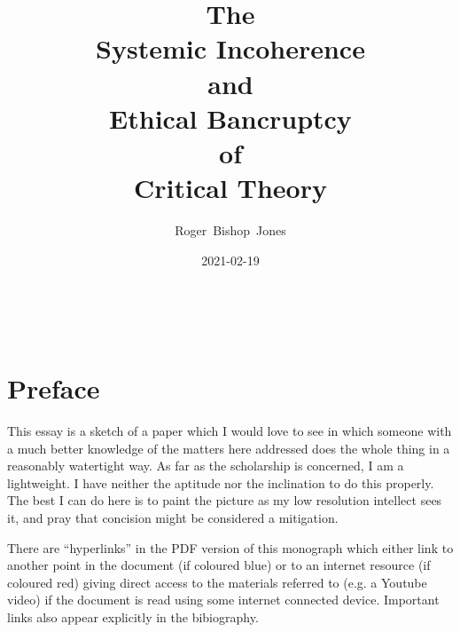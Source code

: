 \documentclass[10pt,titlepage]{article}
\title{\bf{\LARGE The\\Systemic Incoherence\\and\\Ethical Bancruptcy\\of\\Critical Theory}}
\author{Roger~Bishop~Jones}
\date{\small 2021-02-19}
\newcommand{\ignore}[1]{}
\begin{document}
% 
                               
\begin{titlepage}
\maketitle





\end{titlepage}

\ \

\ignore{
\begin{centering}
{}
\end{centering}
}%

\setcounter{tocdepth}{2}
{\parskip-0pt\tableofcontents}


\pagebreak

\section*{Preface}


This essay is a sketch of a paper which I would love to see in which someone with a much better knowledge of the matters here addressed does the whole thing in a reasonably watertight way.
As far as the scholarship is concerned, I am a lightweight.
I have neither the aptitude nor the inclination to do this properly.
The best I can do here is to paint the picture as my low resolution intellect sees it, and pray that concision might be considered a mitigation.

There are ``hyperlinks'' in the PDF version of this monograph which either link to another point in the document  (if coloured blue) or to an internet resource  (if coloured red) giving direct access to the materials referred to (e.g. a Youtube video) if the document is read using some internet connected device.
Important links also appear explicitly in the bibiography.
\end{document}
